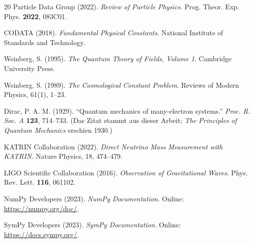 \begin{thebibliography}{20}
Particle Data Group (2022). 
\textit{Review of Particle Physics}. 
Prog. Theor. Exp. Phys. \textbf{2022}, 083C01.

CODATA (2018). 
\textit{Fundamental Physical Constants}. 
National Institute of Standards and Technology.

Weinberg, S. (1995). 
\textit{The Quantum Theory of Fields, Volume 1}. 
Cambridge University Press.

Weinberg, S. (1989). 
\textit{The Cosmological Constant Problem}. 
Reviews of Modern Physics, 61(1), 1--23.

Dirac, P. A. M. (1929).
``Quantum mechanics of many-electron systems.''
\textit{Proc. R. Soc. A} \textbf{123}, 714--733.
(Das Zitat stammt aus dieser Arbeit; \textit{The Principles of Quantum Mechanics} erschien 1930.)

KATRIN Collaboration (2022). 
\textit{Direct Neutrino Mass Measurement with KATRIN}. 
Nature Physics, 18, 474--479.

LIGO Scientific Collaboration (2016). 
\textit{Observation of Gravitational Waves}. 
Phys. Rev. Lett. \textbf{116}, 061102.

NumPy Developers (2023). 
\textit{NumPy Documentation}. 
Online: \url{https://numpy.org/doc/}.

SymPy Developers (2023). 
\textit{SymPy Documentation}. 
Online: \url{https://docs.sympy.org/}.

\end{thebibliography}

